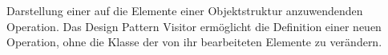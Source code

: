 \glqq Darstellung einer auf die Elemente einer Objektstruktur anzuwendenden Operation. Das Design Pattern Visitor ermöglicht die Definition einer neuen Operation, ohne die Klasse der von ihr bearbeiteten Elemente zu verändern.\grqq